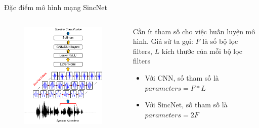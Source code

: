 \documentclass[11pt]{beamer}
\begin{document}
\begin{frame}{Đặc điểm mô hình mạng SincNet}
	\begin{columns}
		\begin{column}{0.47\textwidth}
			\begin{figure}[H]
				\includegraphics[width=0.9\linewidth]{images/SincNet.png}
			\end{figure}
		\end{column}
		\begin{column}{0.5\textwidth}
			Cần ít tham số cho việc huấn luyện mô hình. \newline
			Giả sử ta gọi: $F$ là số bộ lọc filters, $L$ kích thước của mỗi bộ lọc  filters
			\begin{itemize}
				\item Với CNN, số tham số là $parameters = F * L$
				\item Với SincNet, số tham số là $parameters = 2F$
			\end{itemize}
		\end{column}
	\end{columns}
\end{frame}
\end{document}
